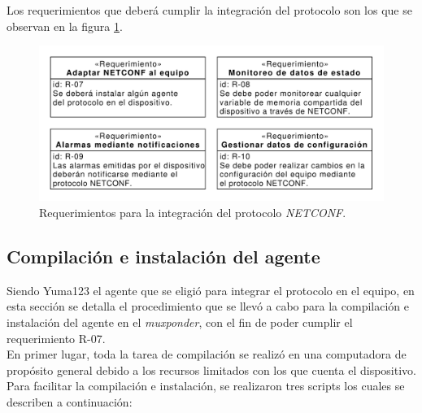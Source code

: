   Los requerimientos que deberá cumplir la integración del protocolo son los que se observan en la figura \ref{fig:req_netconf}.

  \begin{figure}[H]
    \centering
    \includegraphics[scale=0.65]{Figures/req_netconf.pdf}
    \caption{Requerimientos para la integración del protocolo \textit{NETCONF}.}
    \label{fig:req_netconf}
  \end{figure}


  \subsection{Compilación e instalación del agente}
Siendo Yuma123 el agente que se eligió para integrar el protocolo en el equipo, en esta sección se detalla el procedimiento que se llevó a cabo para la compilación e instalación del agente en el \textit{muxponder}, con el fin de poder cumplir el requerimiento R-07.
\\

  En primer lugar, toda la tarea de compilación se realizó en una computadora de propósito general debido a los recursos limitados con los que cuenta el dispositivo. Para facilitar la compilación e instalación, se realizaron tres scripts los cuales se describen a continuación:

